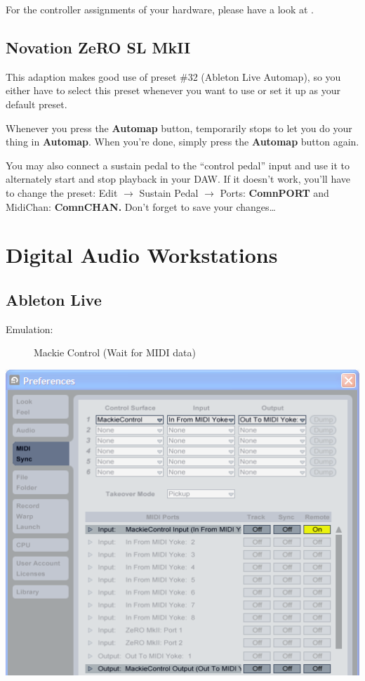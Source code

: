 For the controller assignments of your hardware, please have a look at
.

\section{Novation ZeRO SL MkII}

This adaption makes good use of preset \#32 (Ableton Live Automap), so
you either have to select this preset whenever you want to use
 or set it up as your default preset.

Whenever you press the \textbf{Automap} button,  temporarily stops to let you do your thing in \textbf{Automap}.
When you're done, simply press the \textbf{Automap} button again.

You may also connect a sustain pedal to the ``control pedal'' input
and use it to alternately start and stop playback in your DAW.  If it
doesn't work, you'll have to change the preset: Edit $\rightarrow{}$
Sustain Pedal $\rightarrow{}$ Ports: \textbf{ComnPORT} and MidiChan:
\textbf{ComnCHAN.}  Don't forget to save your changes\dots

\chapter{Digital Audio Workstations}
\label{chap:daw_setup}

\section{Ableton Live}

\begin{description}
\item[Emulation:] Mackie Control (Wait for MIDI data)
\end{description}

\includegraphics[scale=\screenshotscale,clip]{include/images/live_8.png}

